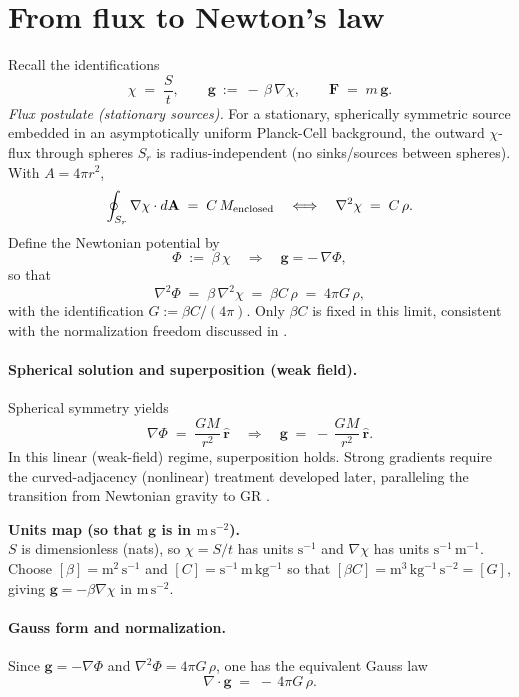 \documentclass[11pt,oneside]{article}
\begin{document}
\section{From flux to Newton’s law}
Recall the identifications
\[
\chi \;=\; \frac{S}{t},\qquad \mathbf g\ :=\ -\,\beta\,\nabla\chi,\qquad \mathbf F \;=\; m\,\mathbf g.
\]
\emph{Flux postulate (stationary sources).} For a stationary, spherically symmetric source embedded in an asymptotically uniform Planck-Cell background, the outward $\chi$-flux through spheres $S_r$ is radius-independent (no sinks/sources between spheres). With $A=4\pi r^2$,
\[
\oint_{S_r}\nabla\chi\cdot d\mathbf A \;=\; C\,M_{\rm enclosed}
\quad\Longleftrightarrow\quad
\nabla^2\chi \;=\; C\,\rho.
\]
Define the Newtonian potential by
\[
\Phi \;:=\; \beta\,\chi \quad\Rightarrow\quad \mathbf g=-\,\nabla\Phi,
\]
so that
\[
\nabla^2\Phi \;=\; \beta\,\nabla^2\chi \;=\; \beta C\,\rho \;=\; 4\pi G\,\rho,
\]
with the identification \(G := \beta C/(4\pi)\).
Only $\beta C$ is fixed in this limit, consistent with the normalization freedom discussed in \cite{langstaff2025_temporal_relativity_entropy_clock}.

\paragraph{Spherical solution and superposition (weak field).}
Spherical symmetry yields
\[
\nabla\Phi \;=\; \frac{G M}{r^2}\,\hat{\mathbf r}
\quad\Rightarrow\quad
\mathbf g \;=\; -\,\frac{G M}{r^2}\,\hat{\mathbf r}.
\]
In this linear (weak-field) regime, superposition holds. Strong gradients require the curved-adjacency (nonlinear) treatment developed later, paralleling the transition from Newtonian gravity to GR \cite{einstein1916foundation}.

\begin{tcolorbox}
\textbf{Units map (so that $\mathbf g$ is in $\mathrm{m\,s^{-2}}$).}\\
$S$ is dimensionless (nats), so $\chi=S/t$ has units $\mathrm{s^{-1}}$ and $\nabla\chi$ has units $\mathrm{s^{-1}\,m^{-1}}$.\\
Choose $[\beta]=\mathrm{m^2\,s^{-1}}$ and $[C]=\mathrm{s^{-1}\,m\,kg^{-1}}$ so that
$[\beta C]=\mathrm{m^3\,kg^{-1}\,s^{-2}}=[G]$, giving $\mathbf g=-\beta\nabla\chi$ in $\mathrm{m\,s^{-2}}$.
\end{tcolorbox}

\paragraph{Gauss form and normalization.}
Since $\mathbf g=-\nabla\Phi$ and $\nabla^2\Phi=4\pi G\,\rho$, one has the equivalent Gauss law
\[
\nabla\!\cdot\!\mathbf g \;=\; -\,4\pi G\,\rho.
\]
\end{document}

